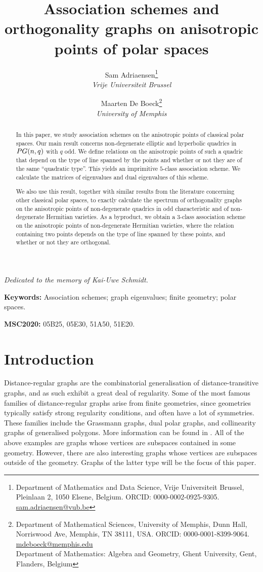 \documentclass[a4paper]{article}
\title{Association schemes and orthogonality graphs on anisotropic points of polar spaces}
\author{Sam Adriaensen\thanks{Department of Mathematics and Data Science, Vrije Universiteit Brussel, Pleinlaan 2, 1050 Elsene, Belgium. ORCID: 0000-0002-0925-9305. \href{mailto:sam.adriaensen@vub.be}{\url{sam.adriaensen@vub.be}}} \\ \textit{Vrije Universiteit Brussel} \and Maarten De Boeck\thanks{Department of Mathematical Sciences, University of Memphis, Dunn Hall, Norriswood Ave, Memphis, TN 38111, USA. ORCID: 0000-0001-8399-9064. \href{mailto:mdeboeck@memphis.edu}{\url{mdeboeck@memphis.edu}}\\Department of Mathematics: Algebra and Geometry, Ghent University, Gent, Flanders, Belgium} \\ \textit{University of Memphis}}
\date{}
\theoremstyle{definition}
\newcommand{\pg}{\textnormal{PG}}
\begin{document}
\maketitle

\begin{center}
 \emph{Dedicated to the memory of Kai-Uwe Schmidt.}
\end{center}

\begin{abstract}
 In this paper, we study association schemes on the anisotropic points of classical polar spaces.
 Our main result concerns non-degenerate elliptic and hyperbolic quadrics in $\pg(n,q)$ with $q$ odd.
 We define relations on the anisotropic points of such a quadric that depend on the type of line spanned by the points and whether or not they are of the same ``quadratic type''.
 This yields an imprimitive $5$-class association scheme.
 We calculate the matrices of eigenvalues and dual eigenvalues of this scheme.

 We also use this result, together with similar results from the literature concerning other classical polar spaces, to exactly calculate the spectrum of orthogonality graphs on the anisotropic points of non-degenerate quadrics in odd characteristic and of non-degenerate Hermitian varieties.
 As a byproduct, we obtain a 3-class association scheme on the anisotropic points of non-degenerate Hermitian varieties, where the relation containing two points depends on the type of line spanned by these points, and whether or not they are orthogonal.
\end{abstract}

\noindent \textbf{Keywords:} Association schemes; graph eigenvalues; finite geometry; polar spaces.

\noindent \textbf{MSC2020:} 05B25, %
05E30, %
51A50, %
51E20. %

\section{Introduction}

Distance-regular graphs are the combinatorial generalisation of distance-transitive graphs, and as such exhibit a great deal of regularity.
Some of the most famous families of distance-regular graphs arise from finite geometries, since geometries typically satisfy strong regularity conditions, and often have a lot of symmetries.
These families include the Grassmann graphs, dual polar graphs, and collinearity graphs of generalised polygons.
More information can be found in \cite{bcn}.
All of the above examples are graphs whose vertices are subspaces contained in some geometry.
However, there are also interesting graphs whose vertices are subspaces outside of the geometry.
Graphs of the latter type will be the focus of this paper.
\end{document}

